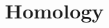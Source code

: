 \documentclass[../../../deep-dive]{subfiles}
\begin{document}

% 
% 
% 
% 
% 
% 
% 


% 
% 
% 


% 


% 


% 


% 


% 

\chapter{Homology}


\end{document}
